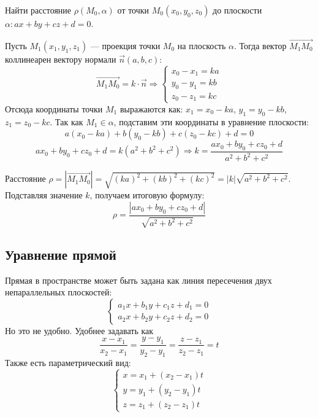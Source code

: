 \documentclass[12pt]{article}
\begin{document}
    \begin{problem}
    	Найти расстояние $\rho(M_0, \alpha)$ от точки $M_0(x_0, y_0, z_0)$ до плоскости $\alpha: ax + by + cz + d = 0$.
    \end{problem}
    
    \begin{solution}
        Пусть $M_1(x_1, y_1, z_1)$ — проекция точки $M_0$ на плоскость $\alpha$. Тогда вектор $\vec{M_1M_0}$ коллинеарен вектору нормали $\vec{n}(a, b, c)$:
        \[
        \vec{M_1M_0} = k \cdot \vec{n} \Rightarrow 
        \begin{cases} 
            x_0 - x_1 = ka \\
            y_0 - y_1 = kb \\
            z_0 - z_1 = kc
        \end{cases}
        \]
        Отсюда координаты точки $M_1$ выражаются как: $x_1 = x_0 - ka$, $y_1 = y_0 - kb$, $z_1 = z_0 - kc$.
        Так как $M_1 \in \alpha$, подставим эти координаты в уравнение плоскости:
        \[
        a(x_0 - ka) + b(y_0 - kb) + c(z_0 - kc) + d = 0
        \]
        \[
        ax_0 + by_0 + cz_0 + d = k(a^2 + b^2 + c^2) \Rightarrow k = \frac{ax_0 + by_0 + cz_0 + d}{a^2 + b^2 + c^2}
        \]
        
        Расстояние $\rho = |\vec{M_1M_0}| = \sqrt{(ka)^2 + (kb)^2 + (kc)^2} = |k|\sqrt{a^2 + b^2 + c^2}$.
        Подставляя значение $k$, получаем итоговую формулу:
        \[
            \boxed{\rho = \frac{|ax_0 + by_0 + cz_0 + d|}{\sqrt{a^2 + b^2 + c^2}}}
        \]
    \end{solution}

	\subsection{Уравнение прямой}
	\begin{statement}
		Прямая в пространстве может быть задана как линия пересечения двух непараллельных плоскостей:
    	\[
    		\begin{cases}
        		a_1x + b_1y + c_1z + d_1 = 0 \\
        		a_2x + b_2y + c_2z + d_2 = 0
    		\end{cases}
    	\]
		Но это не удобно. Удобнее задавать как
		\[
			\frac{x - x_1}{x_2 - x_1} = \frac{y - y_1}{y_2 - y_1} = \frac{z - z_1}{z_2 - z_1} = t
		\]
		Также есть параметрический вид:
		\[
			\begin{cases}
				x = x_1 + (x_2 - x_1)t \\
				y = y_1 + (y_2 - y_1)t \\
				z = z_1 + (z_2 - z_1)t
			\end{cases}
		\]
	\end{statement}
	
\end{document}
